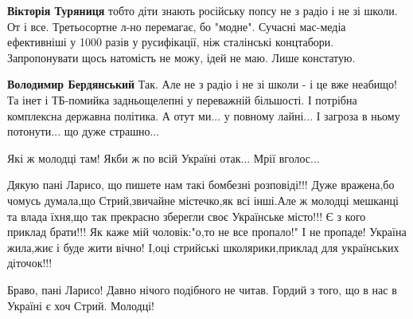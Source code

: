 \begin{itemize}
\textbf{Вікторія Туряниця} тобто діти знають російську попсу не з радіо і не зі школи.
От і все. Третьосортне л-но перемагає, бо "модне". Сучасні мас-медіа
ефективніші у 1000 разів у русифікації, ніж сталінські концтабори.
Запропонувати щось натомість не можу, ідей не маю. Лише констатую.

 

\textbf{Володимир Бердянський} Так. Але не з радіо і не зі школи - і це вже неабищо! Та
інет і ТБ-помийка задньощелепні у переважній більшості. І потрібна комплексна
державна політика. А отут ми... у повному лайні... І загроза в ньому
потонути... що дуже страшно...

 

Які ж молодці там! Якби ж по всій Україні отак... Мрії вголос...

 

Дякую пані Ларисо, що пишете нам такі бомбезні розповіді!!! Дуже вражена,бо
чомусь думала,що Стрий,звичайне містечко,як всі інші.Але ж молодці мешканці та
влада їхня,що так прекрасно зберегли своє Українське місто!!! Є з кого приклад
брати!!! Як каже мій чоловік:"о,то не все пропало!" І не пропаде! Україна
жила,жиє і буде жити вічно! І,оці стрийські школярики,приклад для українських
діточок!!!

 

Браво, пані Ларисо! Давно нічого подібного не читав. Гордий з того, що в нас в
Україні є хоч Стрий. Молодці!

 


\end{itemize}
